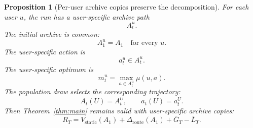 \documentclass{article} %
\newtheorem{proposition}[theorem]{Proposition}
\begin{document}
\begin{proposition}[Per-user archive copies preserve the decomposition]
\label{prop:5}
For each user \(u\), the run has a user-specific archive path
\begin{equation}
\label{eq:app-fourth-user-archive}
A_t^u.
\end{equation}
The initial archive is common:
\begin{equation}
\label{eq:app-fourth-user-common}
A_1^u
=
A_1
\quad
\text{for every }u.
\end{equation}
The user-specific action is
\begin{equation}
\label{eq:app-fourth-user-action}
a_t^u
\in
A_t^u.
\end{equation}
The user-specific optimum is
\begin{equation}
\label{eq:app-fourth-user-m}
m_t^u
=
\max_{a\in A_t^u}
\mu(u,a).
\end{equation}
The population draw selects the corresponding trajectory:
\begin{equation}
\label{eq:app-fourth-user-selection}
A_t(U)=A_t^U,
\qquad
a_t(U)=a_t^U.
\end{equation}
Then Theorem~\ref{thm:main} remains valid with user-specific archive copies:
\begin{equation}
\label{eq:app-fourth-user-decomp}
R_T
=
V_{\mathrm{static}}(A_1)
+
\Delta_{\mathrm{route}}(A_1)
+
\bar G_T
-
\bar L_T.
\end{equation}
\end{proposition}
\end{document}
